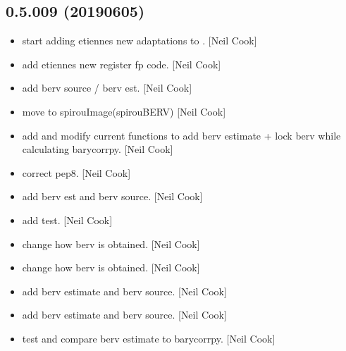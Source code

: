 \documentclass[a4paper,10pt,english]{report}
\begin{document}
\subsection{0.5.009 (2019\sphinxhyphen{}06\sphinxhyphen{}05)}
\label{\detokenize{misc/changelog:id146}}\begin{itemize}
\item {} 
 \sphinxhyphen{} start adding etiennes new adaptations to
. {[}Neil Cook{]}

\item {} 
 \sphinxhyphen{} add etiennes new register fp code. {[}Neil Cook{]}

\item {} 
 \sphinxhyphen{} add berv source / berv est. {[}Neil Cook{]}

\item {} 
 \sphinxhyphen{} move  to spirouImage(spirouBERV)
{[}Neil Cook{]}

\item {} 
 \sphinxhyphen{} add  and modify current functions to add
berv estimate + lock berv while calculating barycorrpy. {[}Neil Cook{]}

\item {} 
 \sphinxhyphen{} correct pep8. {[}Neil Cook{]}

\item {} 
 \sphinxhyphen{} add berv est and berv source. {[}Neil Cook{]}

\item {} 
 \sphinxhyphen{} add  test. {[}Neil Cook{]}

\item {} 
 \sphinxhyphen{} change how berv is obtained. {[}Neil Cook{]}

\item {} 
 \sphinxhyphen{} change how berv is obtained. {[}Neil Cook{]}

\item {} 
 \sphinxhyphen{} add berv estimate and berv source. {[}Neil
Cook{]}

\item {} 
 \sphinxhyphen{} add berv estimate and berv source. {[}Neil
Cook{]}

\item {} 
 \sphinxhyphen{} test and compare berv estimate to
barycorrpy. {[}Neil Cook{]}

\end{itemize}
\end{document}
